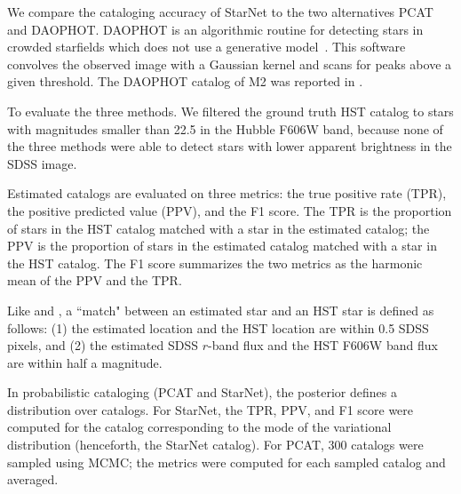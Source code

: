 We compare the cataloging accuracy of StarNet
to the two alternatives PCAT and DAOPHOT.
DAOPHOT is an algorithmic routine for detecting stars in crowded starfields
which does not use a generative model~\citep{stetson2987daophot}.
This software convolves the observed image with a Gaussian kernel and scans for peaks above a given threshold.
The DAOPHOT catalog of M2 was reported in \cite{An_2008_m2}.



To evaluate the three methods.
We filtered the ground truth HST catalog to stars with magnitudes smaller than 22.5 in the Hubble F606W band,
because none of the three methods were able to detect stars
with lower apparent brightness in the SDSS image.


Estimated catalogs are evaluated on three metrics: the true positive rate (TPR),
the positive predicted value (PPV), and the F1 score.
The TPR is the proportion of stars in the HST catalog matched with a star in the estimated catalog;
the PPV is the proportion of stars in the estimated catalog matched with a star in the HST catalog.
The F1 score summarizes the two metrics as the harmonic mean of the PPV and the TPR.

Like \cite{Portillo_2017} and \cite{Feder_2019}, a ``match" between an estimated star
and an HST star is defined as follows: (1) the estimated location and the HST location are within 0.5 SDSS pixels,
and (2) the estimated SDSS $r$-band flux and the HST F606W band flux are within half a magnitude.

In probabilistic cataloging (PCAT and StarNet), the posterior defines a distribution over catalogs.
For StarNet, the TPR, PPV, and F1 score were computed for the catalog corresponding to the mode of the variational distribution (henceforth, the StarNet catalog).
For PCAT, 300 catalogs were sampled using MCMC; the metrics were computed for each sampled catalog and averaged.

